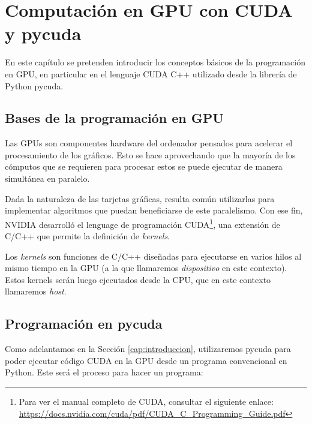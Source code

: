 \chapter{Computación en \ac{GPU} con CUDA y pycuda}
\label{cap:computacion}

\begin{resumen}
	En este capítulo se pretenden introducir los conceptos básicos de la programación en \ac{GPU}, en particular en el lenguaje CUDA C++ utilizado desde la librería de Python pycuda.
\end{resumen}


\section{Bases de la programación en \ac{GPU}}
Las \ac{GPU}s son componentes hardware del ordenador pensados para acelerar el procesamiento de los gráficos. Esto se hace aprovechando que la mayoría de los cómputos que se requieren para procesar estos se puede ejecutar de manera simultánea en paralelo.

Dada la naturaleza de las tarjetas gráficas, resulta común utilizarlas para implementar algoritmos que puedan beneficiarse de este paralelismo. Con ese fin, NVIDIA desarrolló el lenguage de programación \ac{CUDA}\footnote{Para ver el manual completo de CUDA, consultar el siguiente enlace: \url{https://docs.nvidia.com/cuda/pdf/CUDA_C_Programming_Guide.pdf}}, una extensión de C/C++ que permite la definición de \emph{kernels}. 

Los \emph{kernels} son funciones de C/C++ diseñadas para ejecutarse en varios hilos al mismo tiempo en la \ac{GPU} (a la que llamaremos \emph{dispositivo} en este contexto). Estos kernels serán luego ejecutados desde la \ac{CPU}, que en este contexto llamaremos \emph{host}.



\section{Programación en pycuda}
Como adelantamos en la Sección \ref{cap:introduccion}, utilizaremos pycuda para poder ejecutar código \ac{CUDA} en la GPU desde un programa convencional en Python. Este será el proceso para hacer un programa:

